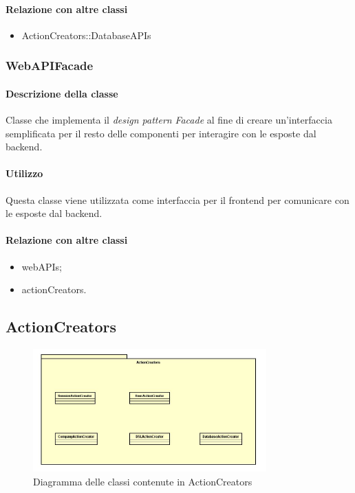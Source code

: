 \paragraph*{Relazione con altre classi}
\begin{itemize}
\item ActionCreators::DatabaseAPIs
\end{itemize}

\subsubsection{WebAPIFacade}
\paragraph*{Descrizione della classe}
Classe che implementa il \textit{design pattern} \textit{Facade} al fine di creare un'interfaccia semplificata per il resto delle componenti per interagire con le  esposte dal backend.
\paragraph*{Utilizzo}
Questa classe viene utilizzata come interfaccia per il frontend per comunicare con le  esposte dal backend.
\paragraph*{Relazione con altre classi}
\begin{itemize}
\item webAPIs;
\item actionCreators.
\end{itemize} 

\subsection{ActionCreators}

\begin{figure}[h]
\centering
\includegraphics[width=0.8\textwidth]{res/sections/imgs/actioncreator-diagram.jpg}
\caption{Diagramma delle classi contenute in ActionCreators}
\end{figure}

